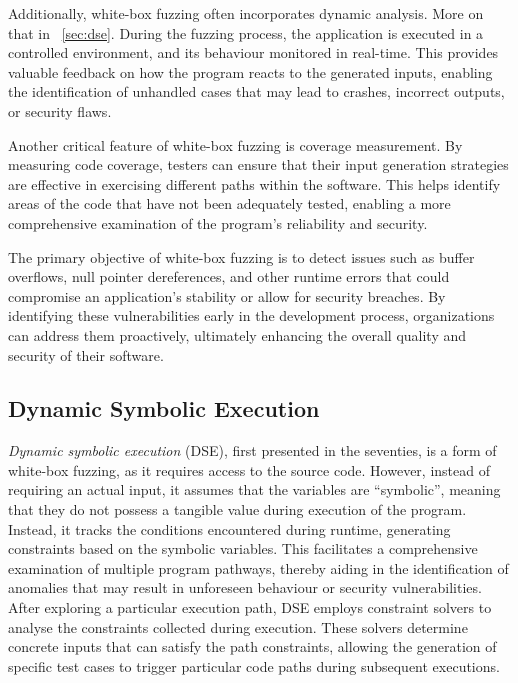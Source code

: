 Additionally, white-box fuzzing often incorporates dynamic analysis. More on that in ~\autoref{sec:dse}. During the fuzzing process, the application is executed in a controlled environment, and its behaviour monitored in real-time. This provides valuable feedback on how the program reacts to the generated inputs, enabling the identification of unhandled cases that may lead to crashes, incorrect outputs, or security flaws.

Another critical feature of white-box fuzzing is coverage measurement. By measuring code coverage, testers can ensure that their input generation strategies are effective in exercising different paths within the software. This helps identify areas of the code that have not been adequately tested, enabling a more comprehensive examination of the program's reliability and security.

The primary objective of white-box fuzzing is to detect issues such as buffer overflows, null pointer dereferences, and other runtime errors that could compromise an application’s stability or allow for security breaches. By identifying these vulnerabilities early in the development process, organizations can address them proactively, ultimately enhancing the overall quality and security of their software.\cite{godefroid_random_2007}




\subsection{Dynamic Symbolic Execution}
\label{sec:dse}
\textit{Dynamic symbolic execution} (DSE), first presented in the seventies, is a form of white-box fuzzing, as it requires access to the source code. However, instead of requiring an actual input, it assumes that the variables are “symbolic”, meaning that they do not possess a tangible value during execution of the program. Instead, it tracks the conditions encountered during runtime, generating constraints based on the symbolic variables. 
This facilitates a comprehensive examination of multiple program pathways, thereby aiding in the identification of anomalies that may result in unforeseen behaviour or security vulnerabilities.
\cite{boyer_selectformal_1975}\cite{king_new_1975}\cite{king_symbolic_1976}\\
After exploring a particular execution path, DSE employs constraint solvers to analyse the constraints collected during execution. These solvers determine concrete inputs that can satisfy the path constraints, allowing the generation of specific test cases to trigger particular code paths during subsequent executions.

